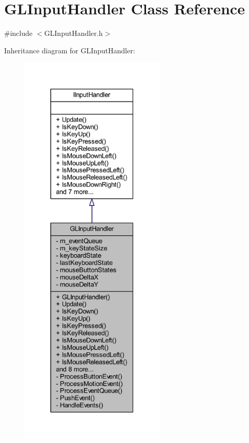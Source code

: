 \hypertarget{class_g_l_input_handler}{}\section{G\+L\+Input\+Handler Class Reference}
\label{class_g_l_input_handler}


{\ttfamily \#include $<$G\+L\+Input\+Handler.\+h$>$}



Inheritance diagram for G\+L\+Input\+Handler\+:\nopagebreak
\begin{figure}[H]
\begin{center}
\leavevmode
\includegraphics[height=550pt]{class_g_l_input_handler__inherit__graph}
\end{center}
\end{figure}


